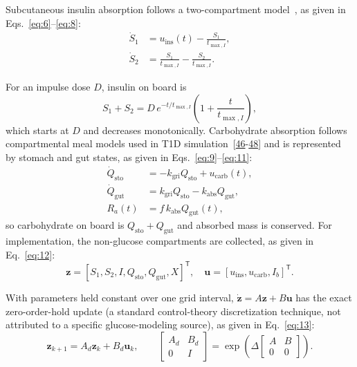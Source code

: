 \documentclass[journal]{IEEEtran}
\begin{document}
Subcutaneous insulin absorption follows a two-compartment model~\cite{ref34}, as given in Eqs.~\eqref{eq:6}--\eqref{eq:8}:
\begin{align}
\dot{S}_1 &= u_{\text{ins}}(t) - \frac{S_1}{t_{\max,I}}, \label{eq:6}\\
\dot{S}_2 &= \frac{S_1}{t_{\max,I}} - \frac{S_2}{t_{\max,I}}. \label{eq:7}
\end{align}

For an impulse dose $D$, insulin on board is
\begin{equation}
S_1 + S_2 = D\,e^{-t/t_{\max,I}}\left(1 + \frac{t}{t_{\max,I}}\right),
\label{eq:8}
\end{equation}
which starts at $D$ and decreases monotonically. Carbohydrate absorption follows compartmental meal models used in T1D simulation~[\hyperref[ref35label]{46}-\hyperref[ref37label]{48}] and is represented by stomach and gut states, as given in Eqs.~\eqref{eq:9}--\eqref{eq:11}:
\begin{align}
\dot{Q}_{\text{sto}} &= -k_{\text{gri}} Q_{\text{sto}} + u_{\text{carb}}(t), \label{eq:9}\\
\dot{Q}_{\text{gut}} &= k_{\text{gri}} Q_{\text{sto}} - k_{\text{abs}} Q_{\text{gut}}, \label{eq:10}\\
R_a(t) &= f\, k_{\text{abs}} Q_{\text{gut}}(t), \label{eq:11}
\end{align}
so carbohydrate on board is $Q_{\text{sto}} + Q_{\text{gut}}$ and absorbed mass is conserved. For implementation, the non-glucose compartments are collected, as given in Eq.~\eqref{eq:12}:
\begin{equation}
\mathbf{z} = {[S_1, S_2, I, Q_{\text{sto}}, Q_{\text{gut}}, X]}^{\mathsf T}, \quad \mathbf{u} = {[u_{\text{ins}}, u_{\text{carb}}, I_b]}^{\mathsf T}.
\label{eq:12}
\end{equation}

With parameters held constant over one grid interval, $\dot{\mathbf{z}} = A\mathbf{z} + B\mathbf{u}$ has the exact zero-order-hold update (a standard control-theory discretization technique, not attributed to a specific glucose-modeling source), as given in Eq.~\eqref{eq:13}:
\begin{equation}
\mathbf{z}_{k+1} = A_d \mathbf{z}_k + B_d \mathbf{u}_k, \qquad
\begin{bmatrix} A_d & B_d \\ 0 & I \end{bmatrix} = \exp\!\left(\Delta \begin{bmatrix} A & B \\ 0 & 0 \end{bmatrix}\right).
\label{eq:13}
\end{equation}
\end{document}
